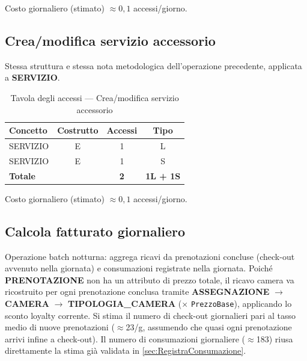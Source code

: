 \documentclass[a4paper,12pt]{report}
\begin{document}
Costo giornaliero (stimato) $\approx 0{,}1$ accessi/giorno.

\subsection{Crea/modifica servizio accessorio}
\label{sec:ServizioOp}

Stessa struttura e stessa nota metodologica dell'operazione precedente,
applicata a \textbf{SERVIZIO}.

\begin{table}[H]
    \centering
    \begin{tabular}{|l|c|c|c|}
        \hline
        \rowcolor{headerblue}
        \textbf{Concetto} & \textbf{Costrutto} & \textbf{Accessi} & \textbf{Tipo}    \\
        \hline
        SERVIZIO          & E                  & 1                & L                \\
        SERVIZIO          & E                  & 1                & S                \\
        \hline
        \rowcolor{gray!25}
        \textbf{Totale}   &                    & \textbf{2}       & \textbf{1L + 1S} \\
        \hline
    \end{tabular}
    \caption{Tavola degli accessi --- Crea/modifica servizio accessorio}
\end{table}

Costo giornaliero (stimato) $\approx 0{,}1$ accessi/giorno.

\newpage

\subsection{Calcola fatturato giornaliero}
\label{sec:FatturatoGiornaliero}

Operazione batch notturna: aggrega ricavi da prenotazioni concluse
(check-out avvenuto nella giornata) e consumazioni registrate nella
giornata. Poiché \textbf{PRENOTAZIONE} non ha un attributo di prezzo
totale, il ricavo camera va ricostruito per ogni prenotazione conclusa
tramite \textbf{ASSEGNAZIONE} $\to$ \textbf{CAMERA} $\to$
\textbf{TIPOLOGIA\_CAMERA} (× \texttt{PrezzoBase}), applicando lo
sconto loyalty corrente. Si stima il numero di check-out giornalieri pari al
tasso medio di nuove prenotazioni ($\approx$23/g, assumendo che quasi
ogni prenotazione arrivi infine a check-out). Il numero di consumazioni
giornaliere ($\approx$183) riusa direttamente la stima già validata in
\cref{sec:RegistraConsumazione}.
\end{document}
